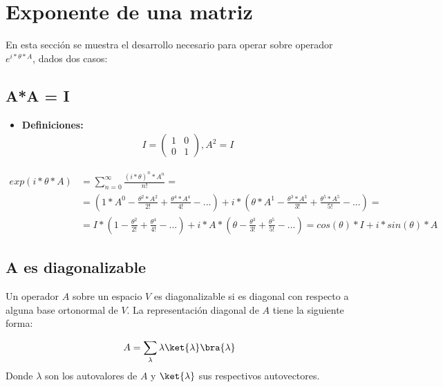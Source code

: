 \section{Exponente de una matriz}

En esta sección se muestra el desarrollo necesario para operar sobre operador $e^{i*\theta*A}$, dados dos casos:

\subsection{A*A = I}
\label{eq:8-funcion A2I}

\begin{itemize}
\item \textbf{Definiciones:}
  \begin{align*}
    I = \begin{pmatrix}
      1 & 0 \\
      0 & 1
    \end{pmatrix}
    , A^2 = I
  \end{align*}
\end{itemize}

\begin{align*}
  exp(i*\theta*A) &= \sum_{n = 0}^{\infty} \frac{(i*\theta)^n * A^n}{n!} = \\
             &= (1*A^0 - \frac{\theta^2*A^2}{2!} + \frac{\theta^4*A^4}{4!} - ...) +
               i*(\theta*A^1 - \frac{\theta^3*A^3}{3!} + \frac{\theta^5*A^5}{5!} - ...) = \\
             &= I*(1 - \frac{\theta^2}{2!} + \frac{\theta^4}{4!} - ...) +
               i*A*(\theta - \frac{\theta^3}{3!} + \frac{\theta^5}{5!} - ...)
               = cos(\theta)*I + i*sin(\theta)*A
\end{align*}

\subsection{A es diagonalizable}
\label{eq:8-funcion A diagonalizable}

Un operador $A$ sobre un espacio $V$ es diagonalizable si es diagonal con respecto a alguna base ortonormal de $V$. La representación diagonal de $A$ tiene la siguiente forma:

\begin{align*}
  A = \sum_\lambda \lambda \ket{\lambda}\bra{\lambda}
\end{align*}
Donde $\lambda$ son los autovalores de $A$ y $\ket{\lambda}$ sus respectivos autovectores.

